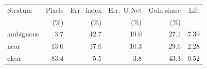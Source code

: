 \begin{tabular}{@{}lrrrrr@{}}
\toprule
Stratum & Pixels & Err.\ index & Err.\ U-Net & Gain share & Lift \\
 & (\%) & (\%) & (\%) & (\%) & \\
\midrule
ambiguous & 3.7 & 42.7 & 19.0 & 27.1 & 7.39 \\
near & 13.0 & 17.6 & 10.3 & 29.6 & 2.28 \\
clear & 83.4 & 5.5 & 3.8 & 43.3 & 0.52 \\
\bottomrule
\end{tabular}